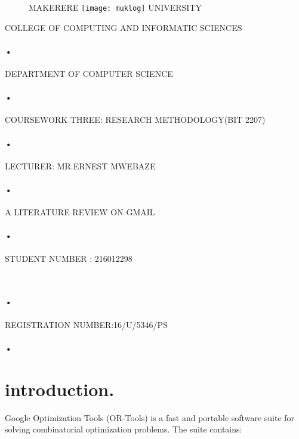 \documentclass[10pt,letterpaper]{article}
\begin{document}
\begin{titlepage}
 \begin{figure}[h]
  \centerline{\small MAKERERE 
  \texttt{[image: muklog]} UNIVERSITY}
\end{figure}
\centerline{COLLEGE OF COMPUTING AND INFORMATIC SCIENCES}
\paragraph{•}
\centerline{DEPARTMENT OF COMPUTER SCIENCE\\}
\paragraph{•}

\centerline{COURSEWORK THREE: RESEARCH METHODOLOGY(BIT 2207)\\}
\paragraph{•}
\centerline{LECTURER: MR.ERNEST MWEBAZE}
\paragraph{•}
         \centerline{A LITERATURE REVIEW ON GMAIL}
          \author{KAMUKAMA DARIET}
 \paragraph{•}
\centerline{STUDENT NUMBER : 216012298}\
\paragraph{•}
\centerline{REGISTRATION NUMBER:16/U/5346/PS}
\paragraph{•}
\end{titlepage}

\tableofcontents
\newpage
{}
\section{introduction.}
Google Optimization Tools (OR-Tools) is a fast and portable software suite for solving combinatorial optimization problems. The suite contains:
\end{document}
